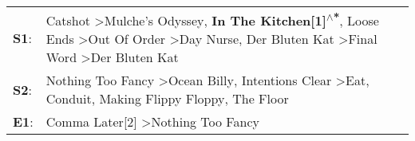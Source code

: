 \begin{supertabular}{p{0.03\textwidth}p{0.92\textwidth}}
 \textbf{S1}:  &  Catshot\textsuperscript{} \textgreater \enspace Mulche's Odyssey\textsuperscript{}, \enspace \textbf{In The Kitchen[1]\textsuperscript{$\wedge$*}}, \enspace Loose Ends\textsuperscript{} \textgreater \enspace Out Of Order\textsuperscript{} \textgreater \enspace Day Nurse\textsuperscript{}, \enspace Der Bluten Kat\textsuperscript{} \textgreater \enspace Final Word\textsuperscript{} \textgreater \enspace Der Bluten Kat\textsuperscript{}  \enspace  \\
 \textbf{S2}:  &                                                                                                                                            Nothing Too Fancy\textsuperscript{} \textgreater \enspace Ocean Billy\textsuperscript{}, \enspace Intentions Clear\textsuperscript{} \textgreater \enspace Eat\textsuperscript{}, \enspace Conduit\textsuperscript{}, \enspace Making Flippy Floppy\textsuperscript{}, \enspace The Floor\textsuperscript{}  \enspace  \\
 \textbf{E1}:  &                                                                                                                                                                                                                                                                                                                                                             Comma Later[2]\textsuperscript{} \textgreater \enspace Nothing Too Fancy\textsuperscript{}  \enspace  \\
\end{supertabular}
